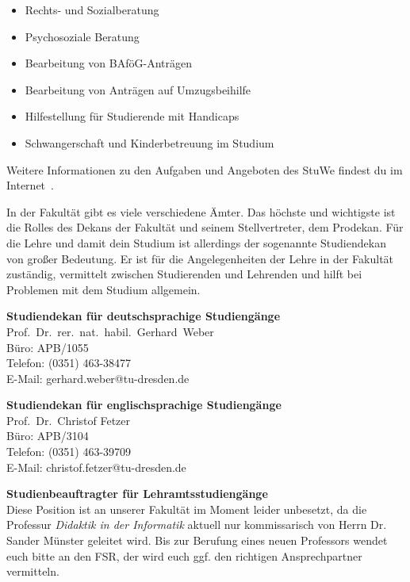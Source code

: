 \begin{itemize}
\item Rechts- und Sozialberatung
\item Psychosoziale Beratung
\item Bearbeitung von BAföG-Anträgen
\item Bearbeitung von Anträgen auf Umzugsbeihilfe
\item Hilfestellung für Studierende mit Handicaps
\item Schwangerschaft und Kinderbetreuung im Studium
\end{itemize}

Weitere Informationen zu den Aufgaben und Angeboten des StuWe findest du im Internet~.

In der Fakultät gibt es viele verschiedene Ämter.
Das höchste und wichtigste ist die Rolles des Dekans der Fakultät und seinem Stellvertreter, dem Prodekan.
Für die Lehre und damit dein Studium ist allerdings der sogenannte Studiendekan von großer Bedeutung.
Er ist für die Angelegenheiten der Lehre in der Fakultät zuständig, vermittelt zwischen Studierenden und Lehrenden und hilft bei Problemen mit dem Studium allgemein.

\pagebreak

\textbf{Studiendekan für deutschsprachige Studiengänge}\\
Prof.\ Dr.\ rer.\ nat.\ habil.\ Gerhard\ Weber \\
Büro: APB/1055 \\
Telefon: (0351) 463-38477 \\
E-Mail: gerhard.weber@tu-dresden.de

\textbf{Studiendekan für englischsprachige Studiengänge}\\
Prof.\ Dr.\ Christof Fetzer \\
Büro: APB/3104 \\
Telefon: (0351) 463-39709 \\
E-Mail: christof.fetzer@​tu-dresden.de

\textbf{Studienbeauftragter für Lehramtsstudiengänge}\\
Diese Position ist an unserer Fakultät im Moment leider unbesetzt, da die Professur \emph{Didaktik in der Informatik} aktuell nur kommissarisch von Herrn Dr. Sander Münster geleitet wird.
Bis zur Berufung eines neuen Professors wendet euch bitte an den FSR, der wird euch ggf. den richtigen Ansprechpartner vermitteln.

